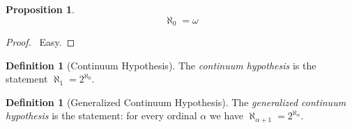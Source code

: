 \documentclass{report}
\let\qed\relax
\newtheorem{prop}[ax]{Proposition}
\theoremstyle{definition}
\newtheorem{df}[ax]{Definition}
\begin{document}
\begin{prop}
\[ \aleph_0 = \omega \]
\end{prop}

\begin{proof}
\pf\ Easy. \qed
\end{proof}

\begin{df}[Continuum Hypothesis]
The \emph{continuum hypothesis} is the statement $\aleph_1 = 2^{\aleph_0}$.
\end{df}

\begin{df}[Generalized Continuum Hypothesis]
The \emph{generalized continuum hypothesis} is the statement: for every ordinal $\alpha$ we have $\aleph_{\alpha + 1} = 2^{\aleph_\alpha}$.
\end{df}
\end{document}
